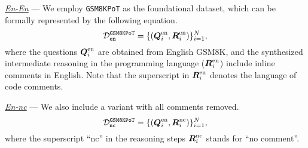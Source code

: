 \vspace{2mm}
\noindent
\underline{\emph{En-En}} --- 
%
% 
We employ \texttt{GSM8KPoT} as the foundational dataset, which can be formally represented by the following equation.
\begin{equation}
\mathcal{D}^\texttt{GSM8KPoT}_\texttt{en} = \{(\vb*{Q}_i^\text{en}, \vb*{R}_i^\text{en})\}_{i=1}^N,
\label{eq:gsm8kpot}
\end{equation}
where the questions $\vb*{Q}_i^\text{en}$ are obtained from English GSM8K, and the synthesized intermediate reasoning in the programming language ($\vb*{R}_i^\text{en}$) include inline comments in English. Note that the superscript  in $\vb*{R}_i^\text{en}$ denotes the language of code comments. 
% 

\vspace{2mm}
\noindent
\underline{\emph{En-nc}} --- We also include a variant with all comments removed.
%
\begin{equation}
\mathcal{D}^\texttt{GSM8KPoT}_\texttt{nc} = \{(\vb*{Q}_i^\text{en}, \vb*{R}_i^\text{nc})\}_{i=1}^N,
\label{eq:gsm8kpot-nc}
\end{equation}
where the superscript ``$\text{nc}$'' in the reasoning steps $\vb*{R}_i^\text{nc}$ stands for ``no comment''. 


%
% 
% 






